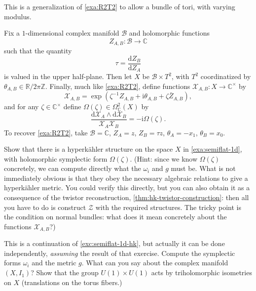 \documentclass[12pt,letterpaper,reqno]{article}
\numberwithin{equation}{section}
\newcommand{\cB}{\ensuremath{\mathcal B}}
\newcommand{\cZ}{\ensuremath{\mathcal Z}}
\newcommand{\cX}{\ensuremath{\mathcal X}}
\newcommand{\R}{\ensuremath{\mathbb R}}
\newcommand{\C}{\ensuremath{\mathbb C}}
\newcommand{\Z}{\ensuremath{\mathbb Z}}
\newcommand{\hk}{hyperk\"ahler\xspace}
\newcommand{\I}{{\mathrm i}}
\newcommand{\de}{\mathrm{d}}
\newcommand{\ti}[1]{\textit{#1}}
\begin{document}
\begin{example} \label{exa:semiflat-1d}
This is a generalization of \autoref{exa:R2T2} to allow a
bundle of tori, with varying modulus.

Fix a $1$-dimensional complex manifold $\cB$
and holomorphic functions
\begin{equation}
  Z_{A,B}: \cB \to \C
\end{equation}
such that the quantity
\begin{equation}
  \tau = \frac{\de Z_B}{\de Z_A}
\end{equation}
is valued in the upper half-plane.
Then let $X$ be $\cB \times T^2$, with $T^2$
coordinatized by $\theta_{A,B} \in \R / 2 \pi \Z$.
Finally, much like \autoref{exa:R2T2}, define functions
$\cX_{A,B}: X \to \C^\times$ by
\begin{equation}
  \cX_{A,B} = \exp \left(\zeta^{-1} Z_{A,B} + \I \theta_{A,B} + \zeta \bar{Z}_{A,B} \right),
\end{equation}
and for any $\zeta \in \C^\times$
define $\Omega(\zeta) \in \Omega^2_\C(X)$ by
\begin{equation}
  \frac{\de \cX_A \wedge \de \cX_B}{\cX_A \cX_B} = -\I \Omega(\zeta).
\end{equation}
To recover \autoref{exa:R2T2}, take $\cB = \C$,
$Z_A = z$, $Z_B = \tau z$, $\theta_A = - x_1$, $\theta_B = x_0$.
\end{example}

\begin{exercise} \label{exc:semiflat-1d-hk} Show that there is a \hk structure on the
space $X$ in \autoref{exa:semiflat-1d}, with holomorphic symplectic
form $\Omega(\zeta)$.
(Hint: since we know $\Omega(\zeta)$ concretely, we can compute
directly what the $\omega_i$ and $g$ must be. What is not immediately
obvious is that they obey the necessary algebraic relations to
give a \hk metric. You could verify this directly, but
you can also obtain it as a consequence of the twistor
reconstruction, \autoref{thm:hk-twistor-construction}: then all you
have to do is construct $\cZ$ with the required structures.
The tricky point is the condition on normal bundles: what does
it mean concretely about the functions $\cX_{A,B}$?)
\end{exercise}

\begin{exercise} This is a continuation of
\autoref{exc:semiflat-1d-hk}, but actually it can be done independently,
\ti{assuming} the result of that exercise.
Compute the symplectic forms $\omega_i$ and the metric $g$.
What can you say about the complex manifold $(X,I_1)$?
Show that the group $U(1) \times U(1)$ acts
by triholomorphic isometries on $X$ (translations on
the torus fibers.)
\end{exercise}
\end{document}
